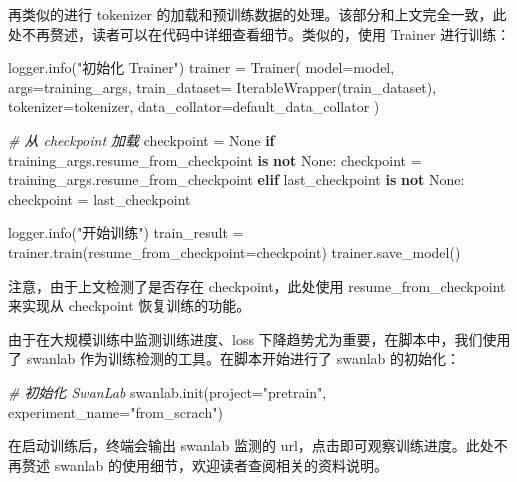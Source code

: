 \documentclass[
]{article}
\newenvironment{Shaded}{}{}
\newcommand{\CommentTok}[1]{\textcolor[rgb]{0.38,0.63,0.69}{\textit{#1}}}
\newcommand{\ControlFlowTok}[1]{\textcolor[rgb]{0.00,0.44,0.13}{\textbf{#1}}}
\newcommand{\KeywordTok}[1]{\textcolor[rgb]{0.00,0.44,0.13}{\textbf{#1}}}
\newcommand{\NormalTok}[1]{#1}
\newcommand{\OperatorTok}[1]{\textcolor[rgb]{0.40,0.40,0.40}{#1}}
\newcommand{\StringTok}[1]{\textcolor[rgb]{0.25,0.44,0.63}{#1}}
\newcommand{\VariableTok}[1]{\textcolor[rgb]{0.10,0.09,0.49}{#1}}
\begin{document}
再类似的进行 tokenizer
的加载和预训练数据的处理。该部分和上文完全一致，此处不再赘述，读者可以在代码中详细查看细节。类似的，使用
Trainer 进行训练：

\begin{Shaded}
\begin{Highlighting}[]
\NormalTok{logger.info(}\StringTok{"初始化 Trainer"}\NormalTok{)}
\NormalTok{trainer }\OperatorTok{=}\NormalTok{ Trainer(}
\NormalTok{    model}\OperatorTok{=}\NormalTok{model,}
\NormalTok{    args}\OperatorTok{=}\NormalTok{training\_args,}
\NormalTok{    train\_dataset}\OperatorTok{=}\NormalTok{ IterableWrapper(train\_dataset),}
\NormalTok{    tokenizer}\OperatorTok{=}\NormalTok{tokenizer,}
\NormalTok{    data\_collator}\OperatorTok{=}\NormalTok{default\_data\_collator}
\NormalTok{)}

\CommentTok{\# 从 checkpoint 加载}
\NormalTok{checkpoint }\OperatorTok{=} \VariableTok{None}
\ControlFlowTok{if}\NormalTok{ training\_args.resume\_from\_checkpoint }\KeywordTok{is} \KeywordTok{not} \VariableTok{None}\NormalTok{:}
\NormalTok{    checkpoint }\OperatorTok{=}\NormalTok{ training\_args.resume\_from\_checkpoint}
\ControlFlowTok{elif}\NormalTok{ last\_checkpoint }\KeywordTok{is} \KeywordTok{not} \VariableTok{None}\NormalTok{:}
\NormalTok{        checkpoint }\OperatorTok{=}\NormalTok{ last\_checkpoint}

\NormalTok{logger.info(}\StringTok{"开始训练"}\NormalTok{)}
\NormalTok{train\_result }\OperatorTok{=}\NormalTok{ trainer.train(resume\_from\_checkpoint}\OperatorTok{=}\NormalTok{checkpoint)}
\NormalTok{trainer.save\_model() }
\end{Highlighting}
\end{Shaded}

注意，由于上文检测了是否存在 checkpoint，此处使用
resume\_from\_checkpoint 来实现从 checkpoint 恢复训练的功能。

由于在大规模训练中监测训练进度、loss
下降趋势尤为重要，在脚本中，我们使用了 swanlab
作为训练检测的工具。在脚本开始进行了 swanlab 的初始化：

\begin{Shaded}
\begin{Highlighting}[]
\CommentTok{\# 初始化 SwanLab}
\NormalTok{swanlab.init(project}\OperatorTok{=}\StringTok{"pretrain"}\NormalTok{, experiment\_name}\OperatorTok{=}\StringTok{"from\_scrach"}\NormalTok{)}
\end{Highlighting}
\end{Shaded}

在启动训练后，终端会输出 swanlab 监测的
url，点击即可观察训练进度。此处不再赘述 swanlab
的使用细节，欢迎读者查阅相关的资料说明。
\end{document}
